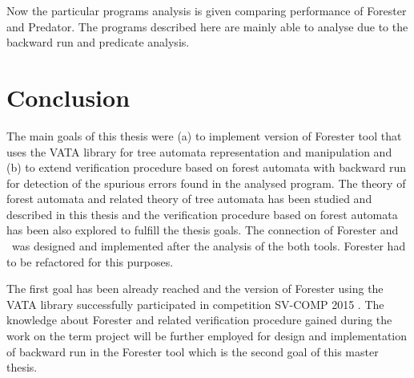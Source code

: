 Now the particular programs analysis is given comparing performance
of Forester and Predator.
The programs described here are mainly able to analyse due to the
backward run and predicate analysis.

\chapter{Conclusion}
\label{ch:concl}

The main goals of this thesis were (a) to implement version of Forester tool that uses the VATA library for tree automata representation and manipulation
and (b) to extend verification procedure based on forest automata with backward run for detection of the spurious errors found in the analysed program.
The theory of forest automata and related theory of tree automata has been studied and described in this thesis and the verification procedure
based on forest automata has been also explored to fulfill the thesis goals.
The connection of Forester and \vata\ was designed and implemented after the analysis of the both tools.
Forester had to be refactored for this purposes.

The first goal has been already reached and the version of Forester using the VATA library successfully participated in competition SV-COMP 2015 \cite{www:svcomp}.
The knowledge about Forester and related verification procedure gained during the work on the term project will be further employed for design
and implementation of backward run in the Forester tool which is the second goal of this master thesis.


